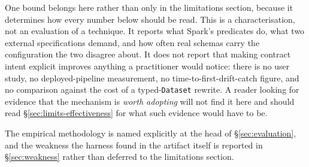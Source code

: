 One bound belongs here rather than only in the limitations section, because it determines how every number below should be read. This is a characterisation, not an evaluation of a technique. It reports what Spark's predicates do, what two external specifications demand, and how often real schemas carry the configuration the two disagree about. It does not report that making contract intent explicit improves anything a practitioner would notice: there is no user study, no deployed-pipeline measurement, no time-to-first-drift-catch figure, and no comparison against the cost of a typed-\texttt{Dataset} rewrite. A reader looking for evidence that the mechanism is \emph{worth adopting} will not find it here and should read \S\ref{sec:limits-effectiveness} for what such evidence would have to be.

The empirical methodology is named explicitly at the head of \S\ref{sec:evaluation}, and the weakness the harness found in the artifact itself is reported in \S\ref{sec:weakness} rather than deferred to the limitations section.
